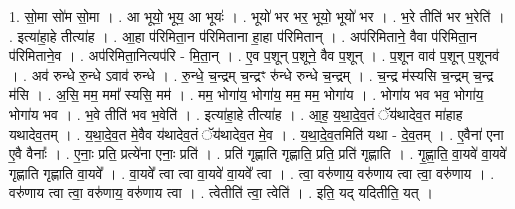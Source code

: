 \documentclass[17pt]{extarticle}
\begin{document}
1. सो॒मा सो॑म सो॒मा । . आ भूयो॒ भूय॒ आ भूयः॑ । . भूयो॑ भर भर॒ भूयो॒ भूयो॑ भर । . भ॒रे तीति॑ भर भ॒रेति॑ । . इत्या॑हा॒हे तीत्या॑ह । . आ॒हा प॑रिमिता॒न प॑रिमिताना हा॒हा प॑रिमितान् । . अप॑रिमिताने॒ वैवा प॑रिमिता॒न प॑रिमिताने॒व । . अप॑रिमिता॒नित्यप॑रि - मि॒ता॒न् । . ए॒व प॒शून् प॒शूने॒ वैव प॒शून् । . प॒शून वाव॑ प॒शून् प॒शूनव॑ । . अव॑ रुन्धे रु॒न्धे ऽवाव॑ रुन्धे । . रु॒न्धे॒ च॒न्द्रम् च॒न्द्रꣳ रु॑न्धे रुन्धे च॒न्द्रम् । . च॒न्द्र म॑स्यसि च॒न्द्रम् च॒न्द्र म॑सि । . अ॒सि॒ मम॒ ममा᳚ स्यसि॒ मम॑ । . मम॒ भोगा॑य॒ भोगा॑य॒ मम॒ मम॒ भोगा॑य । . भोगा॑य भव भव॒ भोगा॑य॒ भोगा॑य भव । . भ॒वे तीति॑ भव भ॒वेति॑ । . इत्या॑हा॒हे तीत्या॑ह । . आ॒ह॒ य॒था॒दे॒व॒तं ॅय॑थादेव॒त मा॑हाह यथादेव॒तम् । . य॒था॒दे॒व॒त मे॒वैव य॑थादेव॒तं ॅय॑थादेव॒त मे॒व । . य॒था॒दे॒व॒तमिति॑ यथा - दे॒व॒तम् । . ए॒वैना॑ एना ए॒वै वैनाः᳚ । . ए॒नाः॒ प्रति॒ प्रत्ये॑ना एनाः॒ प्रति॑ । . प्रति॑ गृह्णाति गृह्णाति॒ प्रति॒ प्रति॑ गृह्णाति । . गृ॒ह्णा॒ति॒ वा॒यवे॑ वा॒यवे॑ गृह्णाति गृह्णाति वा॒यवे᳚ । . वा॒यवे᳚ त्वा त्वा वा॒यवे॑ वा॒यवे᳚ त्वा । . त्वा॒ वरु॑णाय॒ वरु॑णाय त्वा त्वा॒ वरु॑णाय । . वरु॑णाय त्वा त्वा॒ वरु॑णाय॒ वरु॑णाय त्वा । . त्वेतीति॑ त्वा॒ त्वेति॑ । . इति॒ यद् यदितीति॒ यत् । \newline
\end{document}

